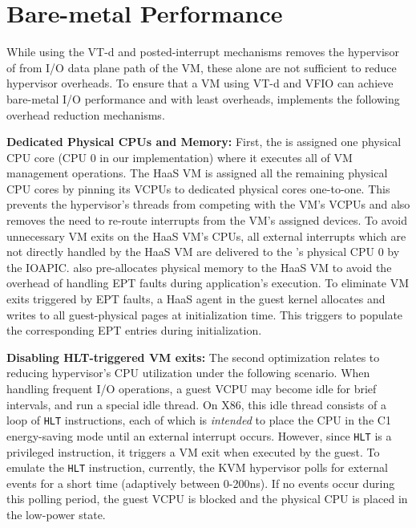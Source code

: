 \section{Bare-metal Performance}
\vspace{-0.05in}
While using the VT-d and posted-interrupt mechanisms removes
the hypervisor of from I/O data plane path of the VM, these alone are
not sufficient to reduce hypervisor overheads.
To ensure that a VM using VT-d and VFIO can achieve bare-metal
I/O performance and with least overheads, \na implements
the following overhead reduction mechanisms.

{\bf Dedicated Physical CPUs and Memory:}
First, the \na is assigned one physical CPU core
(CPU 0 in our implementation)
where it executes all of VM management operations.
The HaaS VM is assigned all the remaining physical
CPU cores by pinning its VCPUs to
dedicated physical cores one-to-one.
This prevents the hypervisor's threads
from competing with the VM's VCPUs and
also removes the need to re-route interrupts
from the VM's assigned devices.
To avoid unnecessary VM exits on the HaaS VM's CPUs,
all external interrupts which are not directly handled
by the HaaS VM are delivered to the \sna's physical
CPU 0 by the IOAPIC.
\na also pre-allocates physical memory to the HaaS VM
to avoid the overhead of handling EPT faults during 
application's execution.
To eliminate VM exits triggered by EPT faults, a HaaS agent in 
the guest kernel allocates and writes to all guest-physical pages 
at initialization time. This triggers \na to populate the 
corresponding EPT entries during initialization.

{\bf Disabling  HLT-triggered VM exits:}
The second optimization relates to reducing hypervisor's CPU utilization
under the following scenario.
When handling frequent I/O operations,
a guest VCPU  may become idle for brief intervals, and
run a special idle thread.
On X86, this idle thread consists of a loop of {\tt HLT} instructions,
each of which is {\em intended} to place the CPU in the C1 energy-saving mode
until an external interrupt occurs.
However, since {\tt HLT} is a privileged instruction, it triggers a
VM exit when executed by the guest.
To emulate the {\tt HLT} instruction, currently, the KVM hypervisor
polls for external events for a short time
(adaptively between 0-200ns). If no events occur during this
polling period, the guest VCPU is blocked and the physical CPU
is placed in the low-power state.

